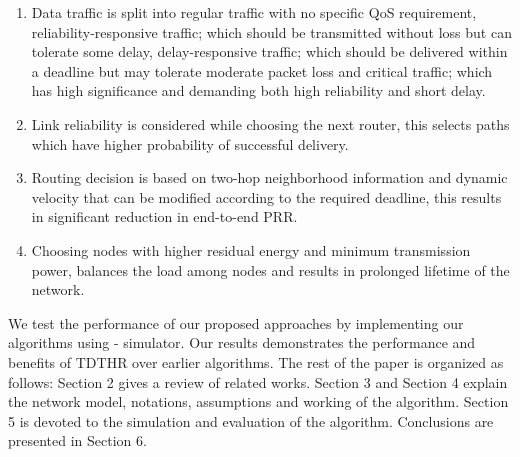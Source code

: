 \documentclass[fleqn,twoside]{article}
\begin{document}
\begin{enumerate}
\item
Data traffic is split into regular traffic with no specific QoS requirement, reliability-responsive traffic; which should be transmitted without loss but can tolerate some delay, delay-responsive traffic; which should be delivered within a deadline but may tolerate moderate packet loss and critical traffic; which has high significance and demanding both high reliability and short delay.
\item
Link reliability is considered while choosing the next router, this selects paths which have higher probability of successful delivery.
\item
Routing decision is based on two-hop neighborhood information and dynamic velocity that can be modified according to the required deadline, this results in significant reduction in end-to-end PRR.
\item
Choosing nodes with higher residual energy and minimum transmission power, balances the load among nodes 
and results in prolonged lifetime of the network.
\end{enumerate}

We test the performance of our proposed approaches by implementing our algorithms using - simulator. Our results
demonstrates the performance and benefits of TDTHR over earlier algorithms.
\vskip 2mm
The rest of the paper is organized as follows: Section 2 gives a review of related works. Section 3 and Section 4 explain the network model, notations, assumptions and working of the algorithm. Section 5 is devoted to the simulation and evaluation of the algorithm. Conclusions are presented in Section 6.
\end{document}
